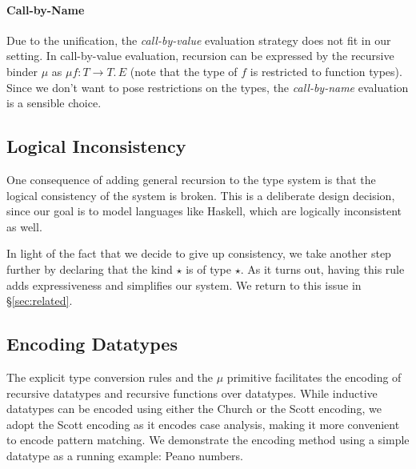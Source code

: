 \paragraph{Call-by-Name}
Due to the unification, the \emph{call-by-value} evaluation strategy
does not fit in our setting. In call-by-value evaluation, recursion
can be expressed by the recursive binder $\mu$ as $\mu f : T
\rightarrow T.\, E$ (note that the type of $f$ is restricted to
function types). Since we don't want to pose restrictions on the
types, the \emph{call-by-name} evaluation is a sensible choice.

\subsection{Logical Inconsistency}

  

One consequence of adding general recursion to the type system is that
the logical consistency of the system is broken. This is a deliberate
design decision, since our goal is to model languages like Haskell,
which are logically inconsistent as well.

In light of the fact that we decide to give up consistency, we take
another step further by declaring that the kind $\star$ is of type
$\star$. As it turns out, having this rule adds expressiveness and
simplifies our system. We return to this issue in \S\ref{sec:related}.


\subsection{Encoding Datatypes}

The explicit type conversion rules and the $\mu$ primitive facilitates
the encoding of recursive datatypes and recursive functions over
datatypes. While inductive datatypes can be encoded using either the
Church or the Scott encoding, we adopt the Scott encoding as it
encodes case analysis, making it more convenient to encode pattern
matching. We demonstrate the encoding method using a simple datatype
as a running example: Peano numbers.

